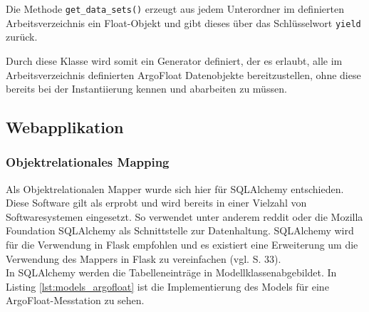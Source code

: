 Die Methode \texttt{get\_data\_sets()} erzeugt aus jedem Unterordner im definierten Arbeitsverzeichnis ein Float-Objekt und gibt dieses über das Schlüsselwort \texttt{yield} zurück. 

Durch diese Klasse wird somit ein Generator definiert, der es erlaubt, alle im Arbeitsverzeichnis definierten ArgoFloat Datenobjekte bereitzustellen, ohne diese bereits bei der Instantiierung kennen und abarbeiten zu müssen.





\subsection{Webapplikation}

\subsubsection{Objektrelationales Mapping}\label{sec:implementierungORM}


Als Objektrelationalen Mapper wurde sich hier für SQLAlchemy entschieden. Diese Software gilt als erprobt und wird bereits in einer Vielzahl von Softwaresystemen eingesetzt. So verwendet unter anderem reddit oder die Mozilla Foundation SQLAlchemy als Schnittstelle zur Datenhaltung. SQLAlchemy wird für die Verwendung in Flask empfohlen und es existiert eine Erweiterung um die Verwendung des Mappers in Flask zu vereinfachen (vgl. \cite{openingtheflask} S. 33). \\


In SQLAlchemy werden die Tabelleneinträge in Modellklassenabgebildet. In Listing \ref{lst:models_argofloat} ist die Implementierung des Models für eine ArgoFloat-Messtation zu sehen.

    
